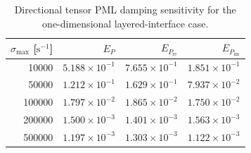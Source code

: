 \begin{table}[htbp]
    \centering
    \caption{Directional tensor PML damping sensitivity for the one-dimensional layered-interface case.}
    \label{tab:pmlSigmaSensitivity}
    \begin{tabular}{rrrr}
        \toprule
        $\sigma_{\max}$ [$\mathrm{s}^{-1}$] & $E_P$ & $E_{P_{\mathrm{re}}}$ & $E_{P_{\mathrm{im}}}$ \\
        \midrule
        10000 & $5.188\times 10^{-1}$ & $7.655\times 10^{-1}$ & $1.851\times 10^{-1}$ \\
        50000 & $1.212\times 10^{-1}$ & $1.629\times 10^{-1}$ & $7.937\times 10^{-2}$ \\
        100000 & $1.797\times 10^{-2}$ & $1.865\times 10^{-2}$ & $1.750\times 10^{-2}$ \\
        200000 & $1.500\times 10^{-3}$ & $1.401\times 10^{-3}$ & $1.563\times 10^{-3}$ \\
        500000 & $1.197\times 10^{-3}$ & $1.303\times 10^{-3}$ & $1.122\times 10^{-3}$ \\
        \bottomrule
    \end{tabular}
\end{table}
